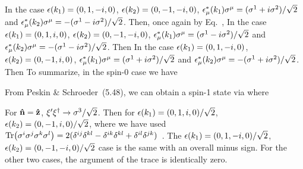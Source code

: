 \documentclass[11pt]{article}
\begin{document}
{	In the case $\epsilon(k_1) = (0, 1, -i, 0)$, $\epsilon(k_2) = (0, -1, -i, 0)$, $\epsilon_\mu^*(k_1) \sigma^\mu = (\sigma^1 + i \sigma^2) / \sqrt{2}$ and $\epsilon_\mu^*(k_2) \sigma^\mu = -(\sigma^1 - i \sigma^2) / \sqrt{2}$.  Then, once again by Eq.~,
	In the case $\epsilon(k_1) = (0, 1, i, 0)$, $\epsilon(k_2) = (0, -1, -i, 0)$, $\epsilon_\mu^*(k_1) \sigma^\mu = (\sigma^1 - i \sigma^2) / \sqrt{2}$ and $\epsilon_\mu^*(k_2) \sigma^\mu = -(\sigma^1 - i \sigma^2) / \sqrt{2}$.  Then
	In the case $\epsilon(k_1) = (0, 1, -i, 0)$, $\epsilon(k_2) = (0, -1, i, 0)$, $\epsilon_\mu^*(k_1) \sigma^\mu = (\sigma^1 + i \sigma^2) / \sqrt{2}$ and $\epsilon_\mu^*(k_2) \sigma^\mu = -(\sigma^1 + i \sigma^2) / \sqrt{2}$.  Then
	To summarize, in the spin-0 case we have
		
	From Peskin \& Schroeder~(5.48), we can obtain a spin-1 state via
	where~\cite[p.~150]{Peskin}
	
	For $\vb{\hat{n}} = \vb{\hat{z}}$, $\xi' \xi^\dag \to \sigma^3 / \sqrt{2}$.  Then for $\epsilon(k_1) = (0, 1, i, 0) / \sqrt{2}$, $\epsilon(k_2) = (0, -1, i, 0) / \sqrt{2}$,
	where we have used $\Tr(\sigma^i \sigma^j \sigma^k \sigma^l) = 2 (\delta^{i j} \delta^{k l} - \delta^{i k} \delta^{k l} + \delta^{i l} \delta^{j k})$~\cite{Pauli}.  The $\epsilon(k_1) = (0, 1, -i, 0) / \sqrt{2}$, $\epsilon(k_2) = (0, -1, -i, 0) / \sqrt{2}$ case is the same with an overall minus sign.  For the other two cases, the argument of the trace is identically zero.
	
}
\end{document}
